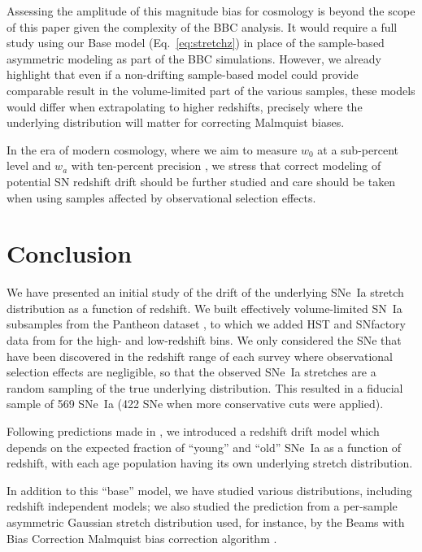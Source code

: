 \documentclass[]{aa}
\begin{document}
Assessing the amplitude of this magnitude bias for cosmology is beyond
the scope of this paper given the complexity of the BBC analysis. It would
require a full study using our Base model (Eq.~\ref{eq:stretchz}) in place of
the sample-based asymmetric modeling as part of the BBC simulations. However, we
already highlight that even if a non-drifting sample-based model could provide
comparable result in the volume-limited part of the various samples, these
models would differ when extrapolating to higher redshifts, precisely where the
underlying distribution will matter for correcting Malmquist biases.

In the era of modern cosmology, where we aim to measure $w_0$ at a
sub-percent level and $w_a$ with ten-percent precision
\citep[e.g.,][]{lsstpaper}, we stress that correct modeling of potential SN
redshift drift should be further studied and care should be taken when using
samples affected by observational selection effects.

\section{Conclusion}\label{sec:ccl}

We have presented an initial study of the drift of the underlying
SNe~Ia stretch distribution as a function of redshift. We built
effectively volume-limited SN~Ia subsamples from the Pantheon dataset
\citep[][SDSS, PS1 and SNLS]{scolnic2018a}, to which we added HST and SNfactory
data from \cite{rigault2020} for the high- and low-redshift bins. We only
considered the SNe that have been discovered in the redshift range of each
survey where observational selection effects are negligible, so that
the observed SNe~Ia stretches are a random sampling of the true underlying
distribution. This resulted in a fiducial sample of 569 SNe~Ia (422 SNe
when more conservative cuts were applied).

Following predictions made in \cite{rigault2020}, we introduced a redshift drift
model which depends on the expected fraction of ``young'' and ``old'' SNe~Ia as
a function of redshift, with each age population having its own
underlying stretch distribution.

In addition to this ``base'' model, we have studied various
distributions, including redshift independent models; we also studied the
prediction from a per-sample asymmetric Gaussian stretch distribution used, for
instance, by the Beams with Bias Correction Malmquist bias correction algorithm
\citep{scolnic2016, kessler2017}.
\end{document}
